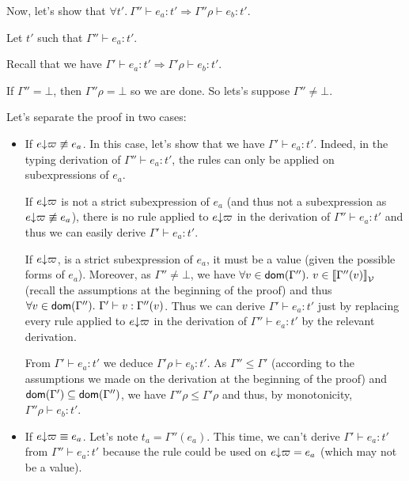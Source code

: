 \documentclass[a4paper]{article}
\theoremstyle{definition}
\begin{document}
\begin{description}
          Now, let's show that $\forall t'.\ \Gamma'' \vdash e_a : t' \Rightarrow \Gamma''\rho \vdash e_b:t'$.

          Let $t'$ such that $\Gamma''\vdash e_a:t'$.

          Recall that we have $\Gamma' \vdash e_a : t' \Rightarrow \Gamma'\rho \vdash e_b:t'$.

          If $\Gamma'' = \bot$, then $\Gamma''\rho = \bot$ so we are done. So lets's suppose $\Gamma'' \neq \bot$.

          Let's separate the proof in two cases:
          \begin{itemize}
            \item If $e{\downarrow}\varpi \not\equiv e_a$. In this case, let's show that we have  $\Gamma'\vdash e_a:t'$.
            Indeed, in the typing derivation of $\Gamma''\vdash e_a:t'$, the  rules can only be applied on
            subexpressions of $e_a$.
            
            If $e{\downarrow}\varpi$ is not a strict subexpression of $e_a$
            (and thus not a subexpression as $e{\downarrow}\varpi \not\equiv e_a$), there is no  rule applied to $e{\downarrow}\varpi$
            in the derivation of $\Gamma''\vdash e_a:t'$ and thus we can easily derive $\Gamma'\vdash e_a:t'$.

            If $e{\downarrow}\varpi$, is a strict subexpression of $e_a$, it must be a value (given the possible forms of $e_a$).
            Moreover, as $\Gamma'' \neq \bot$, we have $\forall v\in\dom{\Gamma''}.\ v\in\valsemantic{\Gamma''(v)}$ (recall the assumptions at the beginning of the proof)
            and thus $\forall v\in\textsf{dom}(\Gamma'').\ \Gamma'\vdash v : \Gamma''(v)$.
            Thus we can derive $\Gamma'\vdash e_a:t'$ just by replacing every  rule applied to $e{\downarrow}\varpi$ in the derivation of $\Gamma''\vdash e_a:t'$
            by the relevant derivation.

            From $\Gamma'\vdash e_a:t'$ we deduce $\Gamma'\rho\vdash e_b:t'$.
            As $\Gamma''\leq\Gamma'$ (according to the assumptions we made on the derivation at the beginning of the proof)
            and $\textsf{dom}(\Gamma')\subseteq\textsf{dom}(\Gamma'')$, we have $\Gamma''\rho\leq\Gamma'\rho$ and thus, by monotonicity,
            $\Gamma''\rho\vdash e_b:t'$.

            \item            
            If $e{\downarrow}\varpi \equiv e_a$. Let's note $t_a=\Gamma''(e_a)$. This time,
            we can't derive $\Gamma'\vdash e_a:t'$ from $\Gamma''\vdash e_a:t'$ because the rule 
            could be used on $e{\downarrow}\varpi=e_a$ (which may not be a value).


\end{itemize}
\end{description}
\end{document}
